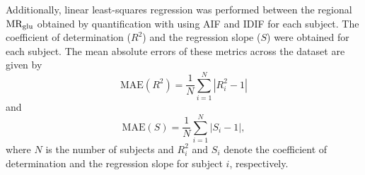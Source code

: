 Additionally, linear least-squares regression was performed between the regional \(\text{MR}_{\text{glu}}\) obtained by quantification with using AIF and IDIF for each subject. The coefficient of determination (\(R^2\)) and the regression slope (\(S\)) were obtained for each subject. The mean absolute errors of these metrics across the dataset are given by
\begin{equation}
	\text{MAE}(R^2) = \frac{1}{N} \sum_{i=1}^{N} \left| R^2_i - 1 \right|
\end{equation}
and
\begin{equation}
	\text{MAE}(S) = \frac{1}{N} \sum_{i=1}^{N} \left| S_i - 1 \right|,
\end{equation}
where $N$ is the number of subjects and \(R^2_i\) and \(S_i\) denote the coefficient of determination and the regression slope for subject \(i\), respectively.
